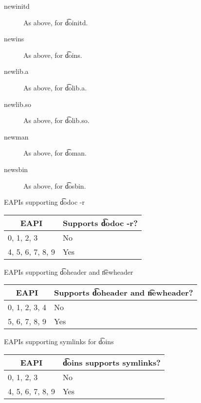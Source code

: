 \begin{description}
\item[newinitd] As above, for \t{doinitd}.

\item[newins] As above, for \t{doins}.

\item[newlib.a] As above, for \t{dolib.a}.

\item[newlib.so] As above, for \t{dolib.so}.

\item[newman] As above, for \t{doman}.

\item[newsbin] As above, for \t{dosbin}.

\end{description}

\begin{centertable}{EAPIs supporting \t{dodoc -r}}
    \label{tab:dodoc-table}
    \begin{tabular}{ll}
      \toprule
      \multicolumn{1}{c}{\textbf{EAPI}} &
      \multicolumn{1}{c}{\textbf{Supports \t{dodoc -r}?}} \\
      \midrule
      0, 1, 2, 3        & No  \\
      4, 5, 6, 7, 8, 9  & Yes \\
      \bottomrule
    \end{tabular}
\end{centertable}

\begin{centertable}{EAPIs supporting \t{doheader} and \t{newheader}}
    \label{tab:doheader-table}
    \begin{tabular}{ll}
      \toprule
      \multicolumn{1}{c}{\textbf{EAPI}} &
      \multicolumn{1}{c}{\textbf{Supports \t{doheader} and \t{newheader}?}} \\
      \midrule
      0, 1, 2, 3, 4     & No  \\
      5, 6, 7, 8, 9     & Yes \\
      \bottomrule
    \end{tabular}
\end{centertable}

\begin{centertable}{EAPIs supporting symlinks for \t{doins}}
    \label{tab:doins-table}
    \begin{tabular}{ll}
      \toprule
      \multicolumn{1}{c}{\textbf{EAPI}} &
      \multicolumn{1}{c}{\textbf{\t{doins} supports symlinks?}} \\
      \midrule
      0, 1, 2, 3        & No  \\
      4, 5, 6, 7, 8, 9  & Yes \\
      \bottomrule
    \end{tabular}
\end{centertable}

